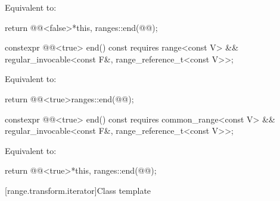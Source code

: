 \begin{itemdescr}
\pnum
\effects
Equivalent to:
\begin{codeblock}
return @@<false>{*this, ranges::end(@@)};
\end{codeblock}
\end{itemdescr}

%
\begin{itemdecl}
constexpr @@<true> end() const
  requires range<const V> &&
           regular_invocable<const F&, range_reference_t<const V>>;
\end{itemdecl}

\begin{itemdescr}
\pnum
\effects
Equivalent to:
\begin{codeblock}
return @@<true>{ranges::end(@@)};
\end{codeblock}
\end{itemdescr}

%
\begin{itemdecl}
constexpr @@<true> end() const
  requires common_range<const V> &&
           regular_invocable<const F&, range_reference_t<const V>>;
\end{itemdecl}

\begin{itemdescr}
\pnum
\effects
Equivalent to:
\begin{codeblock}
return @@<true>{*this, ranges::end(@@)};
\end{codeblock}
\end{itemdescr}

[range.transform.iterator]{Class template }


